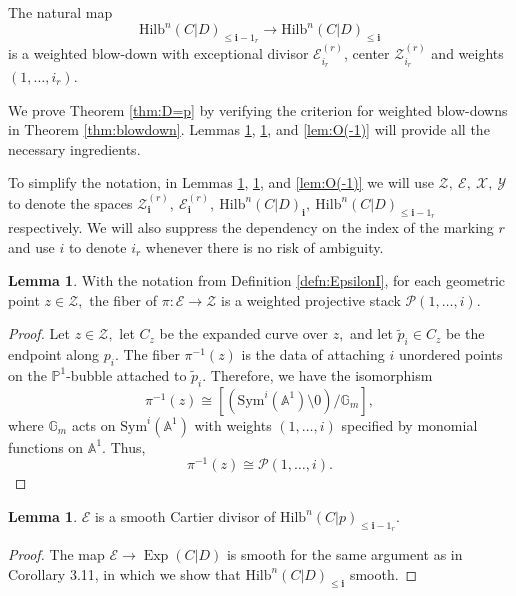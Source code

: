 \documentclass[10.5pt]{amsart}
\theoremstyle{definition}
\newenvironment{customthm}[1]
  {\renewcommand\theinnercustomthm{#1}\innercustomthm}
  {\endinnercustomthm}
\theoremstyle{definition}
\theoremstyle{definition}
\theoremstyle{definition}
\newtheorem{lemma}[theorem]{Lemma}
\newcommand{\Exp}{\operatorname{Exp}}
\newcommand{\PP}{\mathbb{P}}
\newcommand{\Hilb}{\mathrm{Hilb}}
\newcommand{\cZ}{\mathcal{Z}}
\newcommand{\cE}{\mathcal{E}}
\newcommand{\cP}{\mathcal{P}}
\newcommand{\cX}{\mathcal{X}}
\newcommand{\cY}{\mathcal{Y}}
\newcommand{\bi}{\boldsymbol{i}}
\newcommand{\cZri}{\cZ}
\newcommand{\cEri}{\cE}
\newcommand{\piri}{\pi}
\begin{document}
\begin{customthm}{B}\label{thm:D=p}
  The natural map $$ \mathrm{Hilb}^n(C|D)_{\leq \bi-1_r}\to \mathrm{Hilb}^n(C|D)_{\leq \bi}$$ is a weighted blow-down with exceptional divisor $\cE_{i_r}^{(r)}$, center $\cZ^{(r)}_{i_r}$ and weights $(1,\dots,i_r).$
\end{customthm}

We prove Theorem \ref{thm:D=p} by verifying the criterion for weighted blow-downs in Theorem \ref{thm:blowdown}. Lemmas \ref{lem:TWPB}, \ref{lem:Cart}, and \ref{lem:O(-1)} will provide all the necessary ingredients.

{To simplify the notation, in Lemmas \ref{lem:TWPB}, \ref{lem:Cart}, and \ref{lem:O(-1)} we will use $\cZ,\ \cE,\ \cX,\ \cY$ to denote the spaces $\cZ^{(r)}_{\bi}, \ \cE^{(r)}_{\bi}, \ \Hilb^n(C|D)_{\bi},\ \Hilb^n(C|D)_{\le \bi-1_r}$ respectively.} {We will also suppress the dependency on the index of the marking $r$ and use $i$ to denote $i_r$ whenever there is no risk of ambiguity.}

\begin{lemma}\label{lem:TWPB}
    With the notation from Definition \ref{defn:EpsilonI}, for each geometric point $z\in \cZri,$ the fiber of $\piri:\cEri \to \cZri$ is a weighted projective stack $\cP(1,\dots, i).$
\end{lemma}


\begin{proof}
    Let $z\in \cZri,$ let $C_z$ be the expanded curve over $z,$ and let $\tilde{p}_i\in C_z$ be the endpoint along $p_i.$ The fiber $\piri^{-1}(z)$ is the data of attaching $i$ unordered points on the $\PP^1$-bubble attached to $\tilde{p}_i.$ Therefore, we have the isomorphism $$\piri^{-1}(z)\cong [(\mathrm{Sym}^i(\mathbb{A}^1)\setminus 0)/\mathbb{G}_m],$$ where $\mathbb{G}_m$ acts on $\mathrm{Sym}^i(\mathbb{A}^1)$ with weights $(1,\dots, i)$ specified by monomial functions on $\mathbb{A}^1.$ Thus, $$\piri^{-1}(z)\cong \mathcal{P}(1,\dots, i).$$
    \end{proof}

\begin{lemma}\label{lem:Cart}
$\cEri$ is a smooth Cartier divisor of $\Hilb^n(C|p)_{\leq \bi -1_r}.$
\end{lemma}
\begin{proof}
    The map $\cEri\to \Exp(C|D)$ is smooth for the same argument as in Corollary 3.11, in which we show that $\Hilb^n(C|D)_{\leq \bi}$ smooth.
\end{proof}
\end{document}
